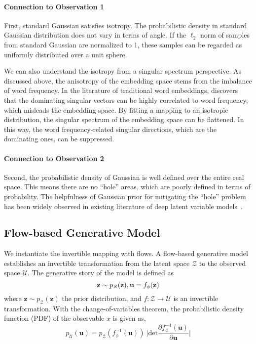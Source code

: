 \documentclass[11pt,a4paper]{article}
\def\rvu{{\mathbf{i}}}
\def\rvu{{\mathbf{u}}}
\def\rvz{{\mathbf{z}}}
\begin{document}
\paragraph{Connection to Observation 1} First, standard Gaussian satisfies isotropy. The probabilistic density in standard Gaussian distribution does not vary in terms of angle. If the $\ell_2$ norm of samples from standard Gaussian are normalized to 1, these samples can be regarded as uniformly distributed over a unit sphere.

We can also understand the isotropy from a singular spectrum perspective. As discussed above, the anisotropy of the embedding space stems from the imbalance of word frequency. In the literature of traditional word embeddings, \citet{mu2017all} discovers that the dominating singular vectors can be highly correlated to word frequency, which misleads the embedding space. By fitting a mapping to an isotropic distribution, the singular spectrum of the embedding space can be flattened. In this way, the word frequency-related singular directions, which are the dominating ones, can be suppressed. 

\paragraph{Connection to Observation 2} Second, the probabilistic density of Gaussian is well defined over the entire real space. This means there are no ``hole'' areas, which are poorly defined in terms of probability. The helpfulness of Gaussian prior for mitigating the ``hole'' problem has been widely observed in existing literature of deep latent variable models~\citep{rezende2018taming,li2019surprisingly,ghosh2019variational}.









\subsection{Flow-based Generative Model}



We instantiate the invertible mapping with flows. A flow-based generative model~\cite{kobyzev2019normalizing} establishes an invertible transformation from the latent space $\mathcal{Z}$ to the observed space $\mathcal{U}$. The generative story of the model is defined as
\begin{equation*}
    \rvz \sim p_{\mathcal{Z}}(\rvz), \rvu = f_{\phi}(\rvz)
    \vspace{-5pt}
\end{equation*}
where $\rvz \sim p_{\mathcal{Z}} (\mathbf{\rvz})$ the prior distribution, and $f: \mathcal{Z} \rightarrow \mathcal{U}$ is an invertible transformation. With the change-of-variables theorem, the probabilistic density function (PDF) of the observable $x$ is given as, 
\begin{equation*}
    \label{eq:flow}
    p_{\mathcal{U}} (\rvu) = p_{\mathcal{Z}} (f_\phi^{-1} (\rvu)) 
    ~\lvert \textrm{det} \frac{\partial f_\phi^{-1} (\rvu)}{\partial \rvu} \rvert
\end{equation*}
\end{document}
